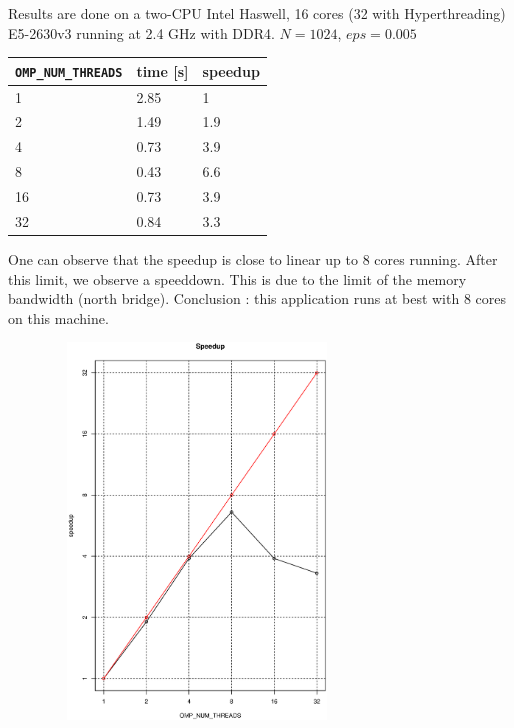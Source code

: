 \documentclass[11pt,a4paper]{article}
\begin{document}
\begin{exercise}
\begin{verbatim}
\end{verbatim}

Results are done on a two-CPU Intel Haswell, 16 cores (32 with Hyperthreading) E5-2630v3 running at 2.4 GHz with DDR4. $N=1024$, $eps=0.005$

\begin{center}
   \begin{tabular}{|l|l|l|}
     \hline
     {\tt OMP\_NUM\_THREADS} & time [s] & speedup \\ \hline \hline
      1 & 2.85 & 1 \\ \hline
      2 & 1.49 & 1.9 \\ \hline
      4 & 0.73 & 3.9 \\ \hline
      8 & 0.43 & 6.6 \\ \hline
      16 & 0.73 & 3.9 \\ \hline
      32 & 0.84 & 3.3 \\ \hline
     \hline
   \end{tabular}
 \end{center}

One can observe that the speedup is close to linear up to 8 cores running. After this limit, we observe a speeddown. This is due to the limit of the memory bandwidth (north bridge). Conclusion : this application runs at best with 8 cores on this machine. 

\begin{center}
    {\includegraphics[height=10cm, width=10cm]{speedup.eps}}
\end{center}

\end{exercise}
\end{document}
